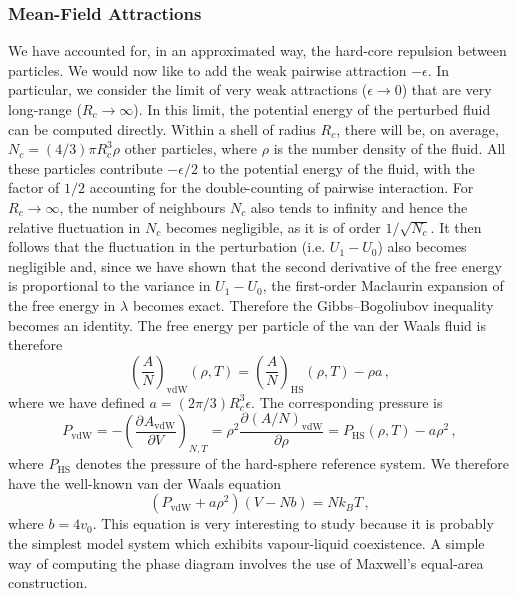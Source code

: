 \documentclass{article}
\theoremstyle{plain}\theoremheaderfont{\normalfont\bfseries}\theorembodyfont{\rmfamily}\theoremseparator{.}\newtheorem*{thm}{Theorem}\newtheorem*{law}{Law}\newtheorem*{pos}{Postulate}
\numberwithin{equation}{section}
\newcommand{\pdv}[3][]{\frac{\partial^{#1} #2}{{\partial #3}^{#1}}}
\begin{document}
    \subsubsection{Mean-Field Attractions}
    We have accounted for, in an approximated way, the hard-core repulsion between particles. We would now like to add the weak pairwise attraction \(-\epsilon\). In particular, we consider the limit of very weak attractions (\(\epsilon\to 0\)) that are very long-range (\(R_c\to\infty\)). In this limit, the potential energy of the perturbed fluid can be computed directly. Within a shell of radius \(R_c\), there will be, on average, \(N_c=(4/3)\pi R_c^3\rho\) other particles, where \(\rho\) is the number density of the fluid. All these particles contribute \(-\epsilon/2\) to the potential energy of the fluid, with the factor of \(1/2\) accounting for the double-counting of pairwise interaction. For \(R_c\to\infty\), the number of neighbours \(N_c\) also tends to infinity and hence the relative fluctuation in \(N_c\) becomes negligible, as it is of order \(1/\sqrt{N_c}\). It then follows that the fluctuation in the perturbation (i.e. \(U_1-U_0\)) also becomes negligible and, since we have shown that the second derivative of the free energy is proportional to the variance in \(U_1-U_0\), the first-order Maclaurin expansion of the free energy in \(\lambda\) becomes exact. Therefore the Gibbs--Bogoliubov inequality becomes an identity. The free energy per particle of the van der Waals fluid is therefore
    \begin{equation}
        \left(\frac{A}{N}\right)_{\text{vdW}}(\rho,T)=\left(\frac{A}{N}\right)_{\text{HS}}(\rho,T)-\rho a\,,
    \end{equation}
    where we have defined \(a=(2\pi/3)R_c^3\epsilon\). The corresponding pressure is
    \begin{equation}
        P_{\text{vdW}}=-\left(\pdv{A_{\text{vdW}}}{V}\right)_{N,T}=\rho^2\pdv{(A/N)_{\text{vdW}}}{\rho}=P_{\text{HS}}(\rho,T)-a\rho^2\,,
    \end{equation}
    where \(P_{\text{HS}}\) denotes the pressure of the hard-sphere reference system. We therefore have the well-known van der Waals equation
    \begin{equation}
        (P_{\text{vdW}}+a\rho^2)(V-Nb)=Nk_B T\,,
    \end{equation}
    where \(b=4v_0\). This equation is very interesting to study because it is probably the simplest model system which exhibits vapour-liquid coexistence. A simple way of computing the phase diagram involves the use of Maxwell's equal-area construction.
\end{document}
